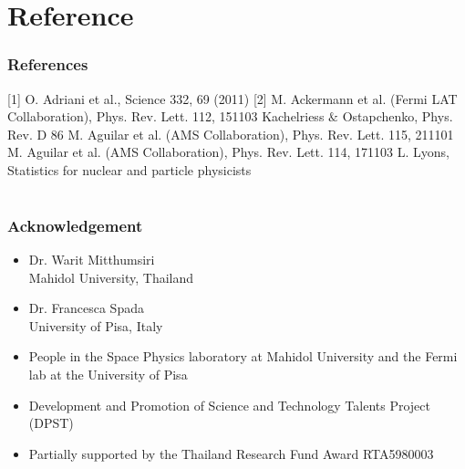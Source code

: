 \documentclass{beamer}
\begin{document}


\section{} %

\section{Reference}
\begin{frame}
\frametitle{References}
[1] O. Adriani et al., Science 332, 69 (2011)
[2] M. Ackermann et al. (Fermi LAT Collaboration), Phys. Rev. Lett. 112, 151103 \newline
[3] Kachelriess $\&$ Ostapchenko, Phys. Rev. D 86 \newline
[4] M. Aguilar et al. (AMS Collaboration), Phys. Rev. Lett. 115, 211101 \newline
[5] M. Aguilar et al. (AMS Collaboration), Phys. Rev. Lett. 114, 171103 \newline
[6] L. Lyons, Statistics for nuclear and particle physicists
\end{frame}
\section{}
\begin{frame}\frametitle{Acknowledgement}
  \begin{itemize}
    \item Dr. Warit Mitthumsiri \\ Mahidol University, Thailand
    \item Dr. Francesca Spada \\ University of Pisa, Italy
    \item People in the Space Physics laboratory at Mahidol University and the Fermi lab at the University of Pisa
    \item Development and Promotion of Science and Technology Talents Project (DPST)
    \item Partially supported by the Thailand Research Fund Award RTA5980003
  \end{itemize}
\end{frame}
\end{document}
